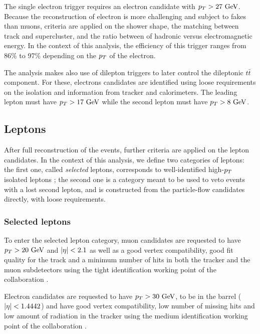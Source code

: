     The single electron trigger requires an electron candidate with $p_T > 27~\text{GeV}$. Because
    the reconstruction of electron is more challenging and subject to fakes than muons,
    criteria are applied on the shower shape, the matching between track and supercluster,
    and the ratio between of hadronic versus electromagnetic energy. In the context of this analysis,
    the efficiency of this trigger ranges from 86\% to 97\% depending on the $p_T$ of the
    electron.

    The analysis makes also use of dilepton triggers to later control the dileptonic
    $t\bar{t}$ component. For these, electrons candidates are identified using loose
    requirements on the isolation and information from tracker and calorimeters. The
    leading lepton must have $p_T > 17~\text{GeV}$ while the second lepton must have $p_T > 8~\text{GeV}$.


        \subsection{Leptons}

    After full reconstruction of the events, further criteria are applied on the lepton
    candidates. In the context of this analysis, we define two categories of leptons:
    the first one, called \emph{selected} leptons, corresponds to well-identified high-$p_T$
    isolated leptons ; the second one is a category meant to be used to veto events with
    a lost second lepton, and is constructed from the particle-flow candidates directly,
    with loose requirements.

            \subsubsection{Selected leptons}

        To enter the selected lepton category, muon candidates are requested to have
    $p_T > 20~\text{GeV}$ and $\left| \eta \right| < 2.1$ as well as a good vertex compatibility, good fit
    quality for the track and a minimum number of hits in both the tracker and the muon
    subdetectors using the tight identification working point of the collaboration
    \cite{MuonID}.

        Electron candidates are requested to have $p_T > 30~\text{GeV}$, to be in the barrel
    ($\left| \eta \right| < 1.4442$) and have good vertex compatibility, low number of missing hits
    and low amount of radiation in the tracker using the medium identification working
    point of the collaboration \cite{ElectronID}.

